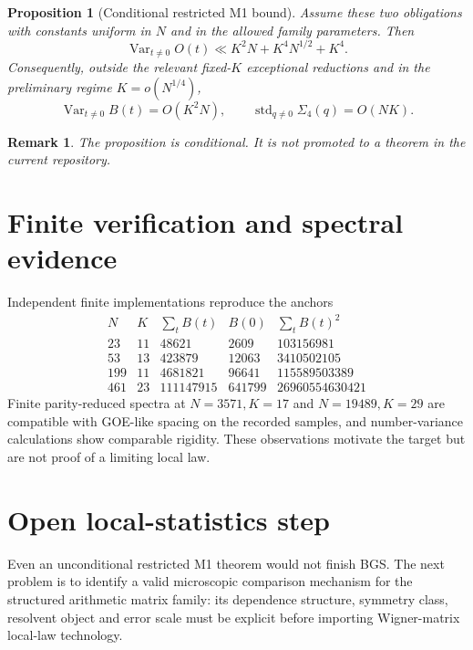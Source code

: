 \documentclass[11pt]{article}
\newtheorem{proposition}[theorem]{Proposition}
\newtheorem{remark}[theorem]{Remark}
\newcommand{\Var}{\operatorname{Var}}
\newcommand{\1}{\mathbf 1}
\begin{document}
\begin{proposition}[Conditional restricted M1 bound]
Assume these two obligations with constants uniform in $N$ and in the allowed family parameters. Then
\[
\Var_{t\ne0}O(t)\ll K^2N+K^4N^{1/2}+K^4.
\]
Consequently, outside the relevant fixed-$K$ exceptional reductions and in the preliminary regime $K=o(N^{1/4})$,
\[
\Var_{t\ne0}B(t)=O(K^2N),\qquad
\operatorname{std}_{q\ne0}\Sigma_4(q)=O(NK).
\]
\end{proposition}

\begin{remark}
The proposition is conditional. It is not promoted to a theorem in the current repository.
\end{remark}

\section{Finite verification and spectral evidence}
Independent finite implementations reproduce the anchors
\[
\begin{array}{c|c|r|r|r}
N&K&\sum_tB(t)&B(0)&\sum_tB(t)^2\\\hline
23&11&48621&2609&103156981\\
53&13&423879&12063&3410502105\\
199&11&4681821&96641&115589503389\\
461&23&111147915&641799&26960554630421
\end{array}
\]
Finite parity-reduced spectra at $N=3571,K=17$ and $N=19489,K=29$ are compatible with GOE-like spacing on the recorded samples, and number-variance calculations show comparable rigidity. These observations motivate the target but are not proof of a limiting local law.

\section{Open local-statistics step}
Even an unconditional restricted M1 theorem would not finish BGS. The next problem is to identify a valid microscopic comparison mechanism for the structured arithmetic matrix family: its dependence structure, symmetry class, resolvent object and error scale must be explicit before importing Wigner-matrix local-law technology.
\end{document}
